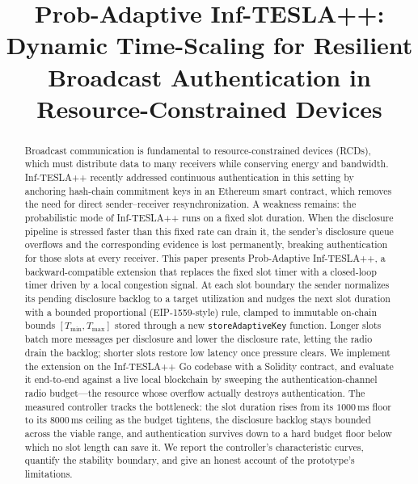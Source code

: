 \documentclass[conference]{IEEEtran}
\begin{document}
\title{Prob-Adaptive Inf-TESLA++: Dynamic Time-Scaling for Resilient Broadcast
Authentication in Resource-Constrained Devices}
\author{
}
\maketitle

\begin{abstract}
Broadcast communication is fundamental to resource-constrained devices (RCDs),
which must distribute data to many receivers while conserving energy and
bandwidth. Inf-TESLA++ recently addressed continuous authentication in this
setting by anchoring hash-chain commitment keys in an Ethereum smart contract,
which removes the need for direct sender--receiver resynchronization. A weakness
remains: the probabilistic mode of Inf-TESLA++ runs on a fixed slot duration.
When the disclosure pipeline is stressed faster than this fixed rate can drain
it, the sender's disclosure queue overflows and the corresponding evidence is
lost permanently, breaking authentication for those slots at every receiver.
This paper presents Prob-Adaptive Inf-TESLA++, a backward-compatible extension
that replaces the fixed slot timer with a closed-loop timer driven by a local
congestion signal. At each slot boundary the sender normalizes its pending
disclosure backlog to a target utilization and nudges the next slot duration
with a bounded proportional (EIP-1559-style) rule, clamped to immutable on-chain
bounds $[T_{\min},T_{\max}]$ stored through a new \texttt{storeAdaptiveKey}
function. Longer slots batch more messages per disclosure and lower the
disclosure rate, letting the radio drain the backlog; shorter slots restore low
latency once pressure clears. We implement the extension on the Inf-TESLA++ Go
codebase with a Solidity contract, and evaluate it end-to-end against a live
local blockchain by sweeping the authentication-channel radio budget---the
resource whose overflow actually destroys authentication. The measured
controller tracks the bottleneck: the slot duration rises from its $1000$\,ms
floor to its $8000$\,ms ceiling as the budget tightens, the disclosure backlog
stays bounded across the viable range, and authentication survives down to a
hard budget floor below which no slot length can save it. We report the
controller's characteristic curves, quantify the stability boundary, and give an
honest account of the prototype's limitations.
\end{abstract}
\end{document}
